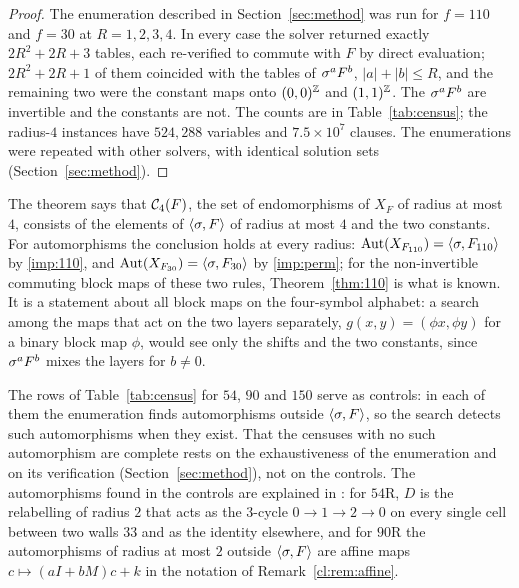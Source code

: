 \begin{proof}
The enumeration described in Section~\ref{sec:method} was run for $f=110$ and $f=30$ at $R=1,2,3,4$. In every case the solver returned exactly $2R^2+2R+3$ tables, each re-verified to commute with $F$ by direct evaluation; $2R^2+2R+1$ of them coincided with the tables of $\sigma^aF^b$, $|a|+|b|\le R$, and the remaining two were the constant maps onto $(0,0)^{\mathbb{Z}}$ and $(1,1)^{\mathbb{Z}}$. The $\sigma^aF^b$ are invertible and the constants are not. The counts are in Table~\ref{tab:census}; the radius-$4$ instances have $524{,}288$ variables and $7.5\times10^7$ clauses. The enumerations were repeated with other solvers, with identical solution sets (Section~\ref{sec:method}).
\end{proof}

The theorem says that $\mathcal{C}_4(F)$, the set of endomorphisms of $X_F$ of radius at most $4$, consists of the elements of $\langle\sigma,F\rangle$ of radius at most $4$ and the two constants. For automorphisms the conclusion holds at every radius: $\operatorname{Aut}(X_{F_{110}})=\langle\sigma,F_{110}\rangle$ by \eqref{imp:110}, and $\operatorname{Aut}(X_{F_{30}})=\langle\sigma,F_{30}\rangle$ by \eqref{imp:perm}; for the non-invertible commuting block maps of these two rules, Theorem~\ref{thm:110} is what is known. It is a statement about all block maps on the four-symbol alphabet: a search among the maps that act on the two layers separately, $g(x,y)=(\phi x,\phi y)$ for a binary block map $\phi$, would see only the shifts and the two constants, since $\sigma^aF^b$ mixes the layers for $b\ne0$.

The rows of Table~\ref{tab:census} for $54$, $90$ and $150$ serve as controls: in each of them the enumeration finds automorphisms outside $\langle\sigma,F\rangle$, so the search detects such automorphisms when they exist. That the censuses with no such automorphism are complete rests on the exhaustiveness of the enumeration and on its verification (Section~\ref{sec:method}), not on the controls. The automorphisms found in the controls are explained in \cite{PaperC}: for $54$R, $D$ is the relabelling of radius $2$ that acts as the $3$-cycle $0\to1\to2\to0$ on every single cell between two walls $33$ and as the identity elsewhere, and for $90$R the automorphisms of radius at most $2$ outside $\langle\sigma,F\rangle$ are affine maps $c\mapsto(aI+bM)c+k$ in the notation of Remark~\ref{cl:rem:affine}.
